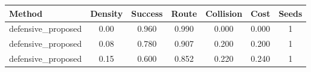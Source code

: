 \begin{tabular}{lcccccc}
\toprule
Method & Density & Success & Route & Collision & Cost & Seeds \\ 
\midrule
defensive_proposed & 0.00 & 0.960 & 0.990 & 0.000 & 0.000 & 1 \\ 
defensive_proposed & 0.08 & 0.780 & 0.907 & 0.200 & 0.200 & 1 \\ 
defensive_proposed & 0.15 & 0.600 & 0.852 & 0.220 & 0.240 & 1 \\ 
\bottomrule
\end{tabular}
